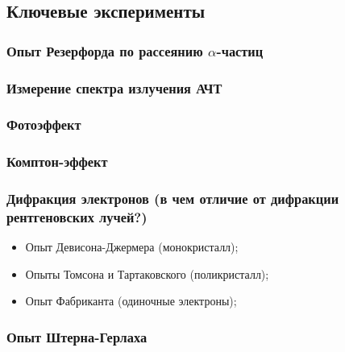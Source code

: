 \subsection{Ключевые эксперименты}

\subsubsection{Опыт Резерфорда по рассеянию $\alpha$-частиц}


\subsubsection{Измерение спектра излучения АЧТ}


\subsubsection{Фотоэффект}


\subsubsection{Комптон-эффект}


\subsubsection{Дифракция электронов (в чем отличие от дифракции рентгеновских лучей?)}
\begin{itemize}
	\item Опыт Девисона-Джермера (монокристалл);
	\item Опыты Томсона  и Тартаковского (поликристалл);
	\item Опыт Фабриканта (одиночные электроны);
\end{itemize}


\subsubsection{Опыт Штерна-Герлаха}

